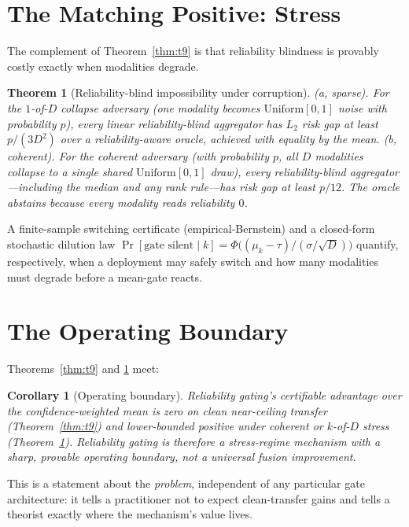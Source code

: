 \documentclass[11pt]{article}
\newtheorem{theorem}{Theorem}
\newtheorem{corollary}{Corollary}
\begin{document}
\section{The Matching Positive: Stress}\label{sec:t1}
The complement of Theorem~\ref{thm:t9} is that reliability blindness is provably
costly exactly when modalities degrade.

\begin{theorem}[Reliability-blind impossibility under corruption]\label{thm:t1}
\emph{(a, sparse).} For the $1$-of-$D$ collapse adversary (one modality becomes
$\mathrm{Uniform}[0,1]$ noise with probability $p$), every \emph{linear}
reliability-blind aggregator has $L_2$ risk gap at least $p/(3D^2)$ over a
reliability-aware oracle, achieved with equality by the mean.
\emph{(b, coherent).} For the coherent adversary (with probability $p$, all $D$
modalities collapse to a single shared $\mathrm{Uniform}[0,1]$ draw), \emph{every}
reliability-blind aggregator---including the median and any rank rule---has risk
gap at least $p/12$. The oracle abstains because every modality reads
reliability $0$.
\end{theorem}

A finite-sample switching certificate (empirical-Bernstein) and a closed-form
stochastic dilution law $\Pr[\text{gate silent}\mid k]=\Phi\!\big((\mu_k-\tau)/
(\sigma/\sqrt D)\big)$ quantify, respectively, when a deployment may safely switch
and how many modalities must degrade before a mean-gate reacts.

\section{The Operating Boundary}\label{sec:boundary}
Theorems~\ref{thm:t9} and \ref{thm:t1} meet:
\begin{corollary}[Operating boundary]
Reliability gating's certifiable advantage over the confidence-weighted mean is
\emph{zero} on clean near-ceiling transfer (Theorem~\ref{thm:t9}) and
\emph{lower-bounded positive} under coherent or $k$-of-$D$ stress
(Theorem~\ref{thm:t1}). Reliability gating is therefore a stress-regime mechanism
with a sharp, provable operating boundary, not a universal fusion improvement.
\end{corollary}
This is a statement about the \emph{problem}, independent of any particular gate
architecture: it tells a practitioner not to expect clean-transfer gains and tells
a theorist exactly where the mechanism's value lives.
\end{document}
